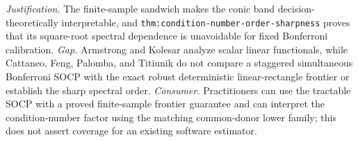\documentclass{article}
\begin{document}
\par\smallskip\noindent \textit{Justification.} The finite-sample sandwich makes the conic band decision-theoretically interpretable, and \texttt{thm:condition-number-order-sharpness} proves that its square-root spectral dependence is unavoidable for fixed Bonferroni calibration. \textit{Gap.} Armstrong and Kolesar analyze scalar linear functionals, while Cattaneo, Feng, Palomba, and Titiunik do not compare a staggered simultaneous Bonferroni SOCP with the exact robust deterministic linear-rectangle frontier or establish the sharp spectral order. \textit{Consumer.} Practitioners can use the tractable SOCP with a proved finite-sample frontier guarantee and can interpret the condition-number factor using the matching common-donor lower family; this does not assert coverage for an existing software estimator.
\end{document}
